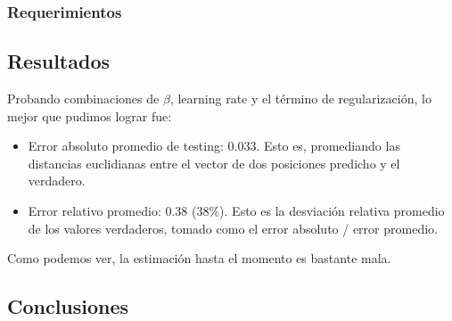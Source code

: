 \subsubsection{Requerimientos}


\subsection{Resultados}

Probando combinaciones de $\beta$, learning rate y el término de regularización, lo mejor que pudimos lograr fue:

\begin{itemize}
	\item Error absoluto promedio de testing: 0.033. Esto es, promediando las distancias euclidianas entre el vector de dos posiciones predicho y el verdadero. 
	\item Error relativo promedio: 0.38 (38$\%$). Esto es la desviación relativa promedio de los valores verdaderos, tomado como el error absoluto / error promedio.
\end{itemize}

Como podemos ver, la estimación hasta el momento es bastante mala.


\subsection{Conclusiones}

